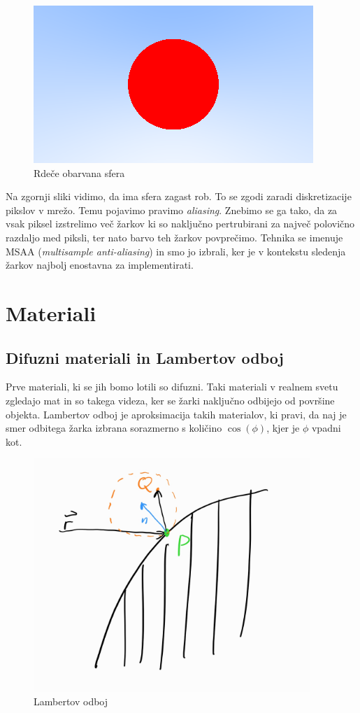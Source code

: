 \documentclass[12pt, a4paper]{article}
\begin{document}
\begin{figure}[H]
	\label{fig:red_sphere}
	\includegraphics[width=\textwidth]{red_sphere}
	\caption{Rdeče obarvana sfera}
\end{figure}

Na zgornji sliki vidimo, da ima sfera zagast rob. To se zgodi zaradi diskretizacije pikslov v mrežo. Temu
pojavimo pravimo \textit{aliasing}. Znebimo se ga tako, da za vsak piksel izstrelimo več žarkov ki so naključno
pertrubirani za največ polovično razdaljo med piksli, ter nato barvo teh žarkov povprečimo. Tehnika se imenuje
MSAA (\textit{multisample anti-aliasing}) in smo jo izbrali, ker je v kontekstu sledenja žarkov najbolj
enostavna za implementirati.

\section{Materiali}

\subsection{Difuzni materiali in Lambertov odboj}

Prve materiali, ki se jih bomo lotili so difuzni. Taki materiali v realnem svetu zgledajo mat in so takega
videza, ker se žarki naključno odbijejo od površine objekta. Lambertov odboj je aproksimacija takih materialov,
ki pravi, da naj je smer odbitega žarka izbrana sorazmerno s količino $\cos (\phi) $, kjer je $\phi$ vpadni
kot.

\begin{figure}[H]
	\centering
	\includegraphics[height=250pt]{shema_difzuni}
	\caption{Lambertov odboj}
\end{figure}
\end{document}
